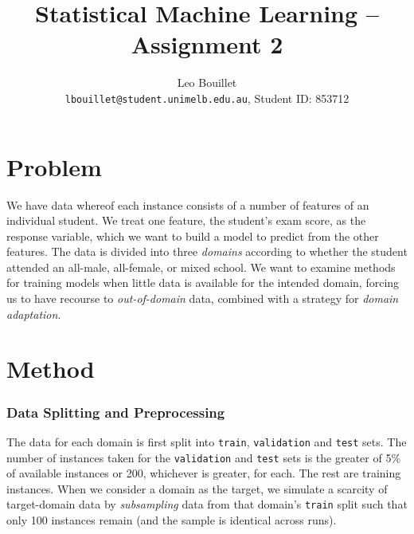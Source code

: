 \documentclass{article}
\title{Statistical Machine Learning -- Assignment 2}
\author{%
  Leo Bouillet \\ %
  \texttt{lbouillet@student.unimelb.edu.au}, Student ID: 853712 
}
\begin{document}
\maketitle

\vspace*{-1cm}
\section{Problem}

We have data whereof each instance consists of a number of features of an individual student. We treat one feature, the student's exam score, as the response variable, which we want to build a model to predict from the other features. The data is divided into three \textit{domains} according to whether the student attended an all-male, all-female, or mixed school. We want to examine methods for training models when little data is available for the intended domain, forcing us to have recourse to \textit{out-of-domain} data, combined with a strategy for \textit{domain adaptation}.

\section{Method}

\subsubsection{Data Splitting and Preprocessing}

The data for each domain is first split into \texttt{train}, \texttt{validation} and \texttt{test} sets. The number of instances taken for the \texttt{validation} and \texttt{test} sets is the greater of 5\% of available instances or 200, whichever is greater, for each. The rest are training instances. When we consider a domain as the target, we simulate a scarcity of target-domain data by \textit{subsampling} data from that domain's \texttt{train} split such that only 100 instances remain (and the sample is identical across runs).
\end{document}
